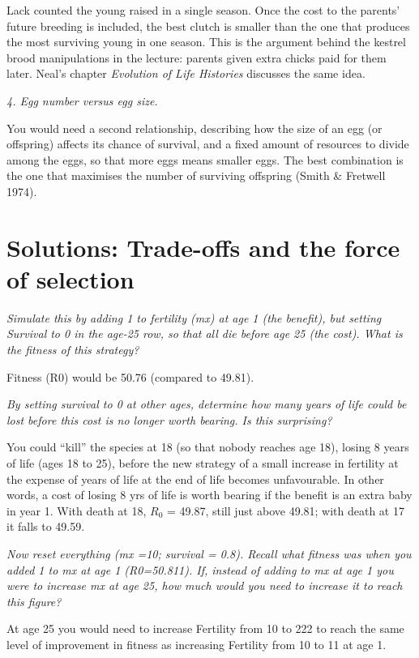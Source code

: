 \documentclass[
  a4paper]{book}
\begin{document}
Lack counted the young raised in a single season. Once the cost to the parents' future breeding is included, the best clutch is smaller than the one that produces the most surviving young in one season. This is the argument behind the kestrel brood manipulations in the lecture: parents given extra chicks paid for them later. Neal's chapter \emph{Evolution of Life Histories} discusses the same idea.

\emph{4. Egg number versus egg size.}

You would need a second relationship, describing how the size of an egg (or offspring) affects its chance of survival, and a fixed amount of resources to divide among the eggs, so that more eggs means smaller eggs. The best combination is the one that maximises the number of surviving offspring (Smith \& Fretwell 1974).

\section{Solutions: Trade-offs and the force of selection}\label{solutions-trade-offs-and-the-force-of-selection}

\emph{Simulate this by adding 1 to fertility (mx) at age 1 (the benefit), but setting Survival to 0 in the age-25 row, so that all die before age 25 (the cost). What is the fitness of this strategy?}

Fitness (R0) would be 50.76 (compared to 49.81).

\emph{By setting survival to 0 at other ages, determine how many years of life could be lost before this cost is no longer worth bearing. Is this surprising?}

You could ``kill'' the species at 18 (so that nobody reaches age 18), losing 8 years of life (ages 18 to 25), before the new strategy of a small increase in fertility at the expense of years of life at the end of life becomes unfavourable. In other words, a cost of losing 8 yrs of life is worth bearing if the benefit is an extra baby in year 1. With death at 18, \(R_0\) = 49.87, still just above 49.81; with death at 17 it falls to 49.59.

\emph{Now reset everything (mx =10; survival = 0.8). Recall what fitness was when you added 1 to mx at age 1 (R0=50.811).
If, instead of adding to mx at age 1 you were to increase mx at age 25, how much would you need to increase it to reach this figure?}

At age 25 you would need to increase Fertility from 10 to 222 to reach the same level of improvement in fitness as increasing Fertility from 10 to 11 at age 1.
\end{document}
